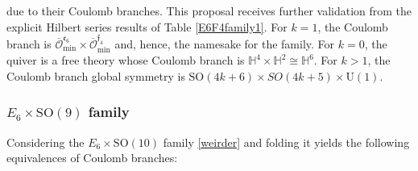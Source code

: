 \documentclass[a4paper,11pt]{article}
\newcommand{\urm}{\mathrm{U}}
\newcommand{\sorm}{\mathrm{SO}}
\begin{document}
due to their Coulomb branches. This proposal receives further validation from the explicit Hilbert series results of Table \ref{E6F4family1}.
For $k=1$, the Coulomb branch is  $\overline{\mathcal{O}}^{\mathfrak{e}_6}_{\text{min}}\times \overline{\mathcal{O}}^{\mathfrak{f}_4}_{\text{min}}$ and, hence, the namesake for the family. For $k=0$, the quiver is a free theory whose Coulomb branch is $\mathbb{H}^4\times \mathbb{H}^2 \cong \mathbb{H}^6$. For $k>1$, the Coulomb branch global symmetry is $\sorm(4k+6)\times SO(4k+5)\times \urm(1)$. 
% 
\subsubsection{\texorpdfstring{$E_6\times \sorm(9)$ family}{E6 x  SO9 family}}
Considering the $E_6\times \sorm(10) $ family \eqref{weirder} and folding it yields the following equivalences of Coulomb branches:
\end{document}

